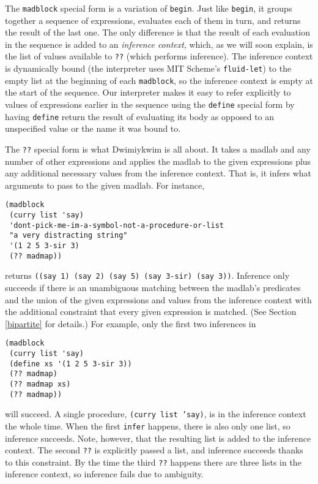 \documentclass[11pt]{article}
\begin{document}
The \texttt{madblock} special form is a variation of \texttt{begin}.
Just like \texttt{begin},
it groups together a sequence of expressions,
evaluates each of them in turn,
and returns the result of the last one.
The only difference is that the result of each evaluation in the sequence
is added to an \emph{inference context},
which, as we will soon explain,
is the list of values available to \texttt{??}
(which performs inference).
The inference context is dynamically bound
(the interpreter uses MIT Scheme's \texttt{fluid-let})
to the empty list at the beginning of each \texttt{madblock},
so the inference context is empty at the start of the sequence.
Our interpreter makes it easy to refer explicitly
to values of expressions earlier in the sequence
using the \texttt{define} special form
by having \texttt{define} return the result of evaluating its body
as opposed to an unspecified value or the name it was bound to.

The \texttt{??} special form is what Dwimiykwim is all about.
It takes a madlab and any number of other expressions
and applies the madlab to the given expressions
plus any additional necessary values from the inference context.
That is, it infers what arguments to pass to the given madlab.
For instance,
\begin{Verbatim}
(madblock
 (curry list 'say)
 'dont-pick-me-im-a-symbol-not-a-procedure-or-list
 "a very distracting string"
 '(1 2 5 3-sir 3)
 (?? madmap))
\end{Verbatim}
returns \texttt{((say 1) (say 2) (say 5) (say 3-sir) (say 3))}.
Inference only succeeds if there is an unambiguous matching
between the madlab's predicates and the union of the given expressions
and values from the inference context
with the additional constraint that every given expression is matched.
(See Section \ref{bipartite} for details.)
For example, only the first two inferences in
\begin{Verbatim}
(madblock
 (curry list 'say)
 (define xs '(1 2 5 3-sir 3))
 (?? madmap)
 (?? madmap xs)
 (?? madmap))
\end{Verbatim}
will succeed.
A single procedure, \texttt{(curry list 'say)},
is in the inference context the whole time.
When the first \texttt{infer} happens,
there is also only one list, so inference succeeds.
Note, however, that the resulting list is added to the inference context.
The second \texttt{??} is explicitly passed a list,
and inference succeeds thanks to this constraint.
By the time the third \texttt{??} happens
there are three lists in the inference context,
so inference fails due to ambiguity.
\end{document}
